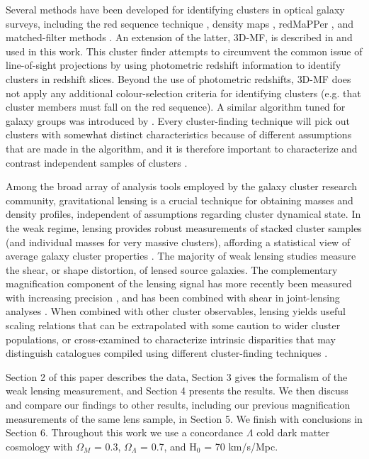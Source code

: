 Several methods have been developed for identifying clusters in optical galaxy surveys, including the red sequence technique \citep{Gladders00}, density maps \citep{Adami10}, redMaPPer \citep{Rykoff14}, and matched-filter methods \citep{Postman96}. An extension of the latter, \ac{3D-MF}, is described in \citet{Milkeraitis10} and used in this work. This cluster finder attempts to circumvent the common issue of line-of-sight projections by using photometric redshift information to identify clusters in redshift slices. Beyond the use of photometric redshifts, \ac{3D-MF} does not apply any additional colour-selection criteria for identifying clusters (e.g. that cluster members must fall on the red sequence). A similar algorithm tuned for galaxy groups was introduced by \citet{Gillis11}. Every cluster-finding technique will pick out clusters with somewhat distinct characteristics because of different assumptions that are made in the algorithm, and it is therefore important to characterize and contrast independent samples of clusters \citep{Milkeraitis10}.

Among the broad array of analysis tools employed by the galaxy cluster research community, gravitational lensing is a crucial technique for obtaining masses and density profiles, independent of assumptions regarding cluster dynamical state. In the weak regime, lensing provides robust measurements of stacked cluster samples (and individual masses for very massive clusters), affording a statistical view of average galaxy cluster properties \citep{Hoekstra13}. The majority of weak lensing studies measure the shear, or shape distortion, of lensed source galaxies. The complementary magnification component of the lensing signal has more recently been measured with increasing precision \citep{Scranton05,Hildebrandt09b,Ford12,Ford14,Morrison12,Hildebrandt13,Bauer14}, and has been combined with shear in joint-lensing analyses \citep{Umetsu11,Umetsu14}. When combined with other cluster observables, lensing yields useful scaling relations that can be extrapolated with some caution to wider cluster populations, or cross-examined to characterize intrinsic disparities that may distinguish catalogues compiled using different cluster-finding techniques \citep{Hoekstra07,Johnston07,Leauthaud10,Hoekstra12,Covone14,Oguri14}.

Section 2 of this paper describes the data, Section 3 gives the formalism of the weak lensing measurement, and Section 4 presents the results. We then discuss and compare our findings to other results, including our previous magnification measurements of the same lens sample, in Section 5. We finish with conclusions in Section 6. Throughout this work we use a concordance $\Lambda$ cold dark matter cosmology with $\Omega_M$ = 0.3, $\Omega_{\Lambda}$ = 0.7, and H$_0$ = 70 km/s/Mpc.

